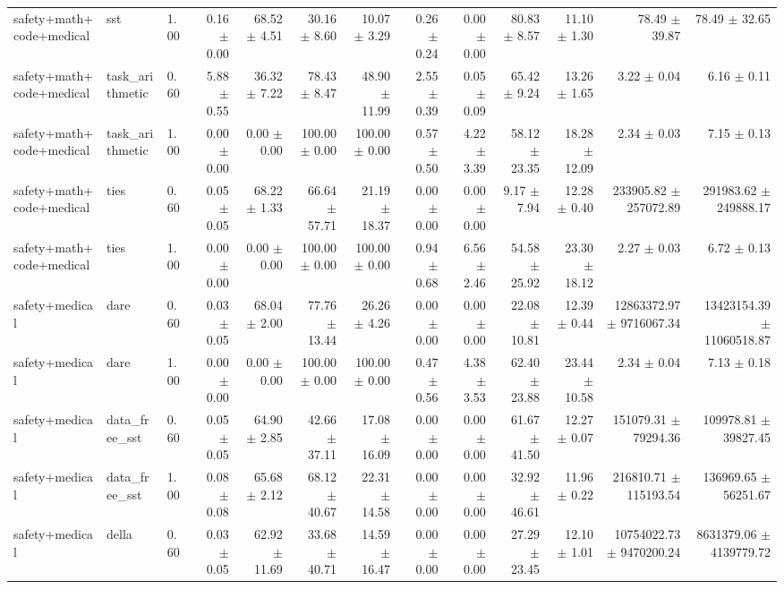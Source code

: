 \documentclass{article}
\begin{document}
{\begin{tabular}{lllrrrrrrrrrr}
safety+math+code+medical & sst & 1.00 & 0.16 $\pm$ 0.00 & 68.52 $\pm$ 4.51 & 30.16 $\pm$ 8.60 & 10.07 $\pm$ 3.29 & 0.26 $\pm$ 0.24 & 0.00 $\pm$ 0.00 & 80.83 $\pm$ 8.57 & 11.10 $\pm$ 1.30 & 78.49 $\pm$ 39.87 & 78.49 $\pm$ 32.65 \\
safety+math+code+medical & task\_arithmetic & 0.60 & 5.88 $\pm$ 0.55 & 36.32 $\pm$ 7.22 & 78.43 $\pm$ 8.47 & 48.90 $\pm$ 11.99 & 2.55 $\pm$ 0.39 & 0.05 $\pm$ 0.09 & 65.42 $\pm$ 9.24 & 13.26 $\pm$ 1.65 & 3.22 $\pm$ 0.04 & 6.16 $\pm$ 0.11 \\
safety+math+code+medical & task\_arithmetic & 1.00 & 0.00 $\pm$ 0.00 & 0.00 $\pm$ 0.00 & 100.00 $\pm$ 0.00 & 100.00 $\pm$ 0.00 & 0.57 $\pm$ 0.50 & 4.22 $\pm$ 3.39 & 58.12 $\pm$ 23.35 & 18.28 $\pm$ 12.09 & 2.34 $\pm$ 0.03 & 7.15 $\pm$ 0.13 \\
safety+math+code+medical & ties & 0.60 & 0.05 $\pm$ 0.05 & 68.22 $\pm$ 1.33 & 66.64 $\pm$ 57.71 & 21.19 $\pm$ 18.37 & 0.00 $\pm$ 0.00 & 0.00 $\pm$ 0.00 & 9.17 $\pm$ 7.94 & 12.28 $\pm$ 0.40 & 233905.82 $\pm$ 257072.89 & 291983.62 $\pm$ 249888.17 \\
safety+math+code+medical & ties & 1.00 & 0.00 $\pm$ 0.00 & 0.00 $\pm$ 0.00 & 100.00 $\pm$ 0.00 & 100.00 $\pm$ 0.00 & 0.94 $\pm$ 0.68 & 6.56 $\pm$ 2.46 & 54.58 $\pm$ 25.92 & 23.30 $\pm$ 18.12 & 2.27 $\pm$ 0.03 & 6.72 $\pm$ 0.13 \\
safety+medical & dare & 0.60 & 0.03 $\pm$ 0.05 & 68.04 $\pm$ 2.00 & 77.76 $\pm$ 13.44 & 26.26 $\pm$ 4.26 & 0.00 $\pm$ 0.00 & 0.00 $\pm$ 0.00 & 22.08 $\pm$ 10.81 & 12.39 $\pm$ 0.44 & 12863372.97 $\pm$ 9716067.34 & 13423154.39 $\pm$ 11060518.87 \\
safety+medical & dare & 1.00 & 0.00 $\pm$ 0.00 & 0.00 $\pm$ 0.00 & 100.00 $\pm$ 0.00 & 100.00 $\pm$ 0.00 & 0.47 $\pm$ 0.56 & 4.38 $\pm$ 3.53 & 62.40 $\pm$ 23.88 & 23.44 $\pm$ 10.58 & 2.34 $\pm$ 0.04 & 7.13 $\pm$ 0.18 \\
safety+medical & data\_free\_sst & 0.60 & 0.05 $\pm$ 0.05 & 64.90 $\pm$ 2.85 & 42.66 $\pm$ 37.11 & 17.08 $\pm$ 16.09 & 0.00 $\pm$ 0.00 & 0.00 $\pm$ 0.00 & 61.67 $\pm$ 41.50 & 12.27 $\pm$ 0.07 & 151079.31 $\pm$ 79294.36 & 109978.81 $\pm$ 39827.45 \\
safety+medical & data\_free\_sst & 1.00 & 0.08 $\pm$ 0.08 & 65.68 $\pm$ 2.12 & 68.12 $\pm$ 40.67 & 22.31 $\pm$ 14.58 & 0.00 $\pm$ 0.00 & 0.00 $\pm$ 0.00 & 32.92 $\pm$ 46.61 & 11.96 $\pm$ 0.22 & 216810.71 $\pm$ 115193.54 & 136969.65 $\pm$ 56251.67 \\
safety+medical & della & 0.60 & 0.03 $\pm$ 0.05 & 62.92 $\pm$ 11.69 & 33.68 $\pm$ 40.71 & 14.59 $\pm$ 16.47 & 0.00 $\pm$ 0.00 & 0.00 $\pm$ 0.00 & 27.29 $\pm$ 23.45 & 12.10 $\pm$ 1.01 & 10754022.73 $\pm$ 9470200.24 & 8631379.06 $\pm$ 4139779.72 \\

\end{tabular}}
\end{document}
